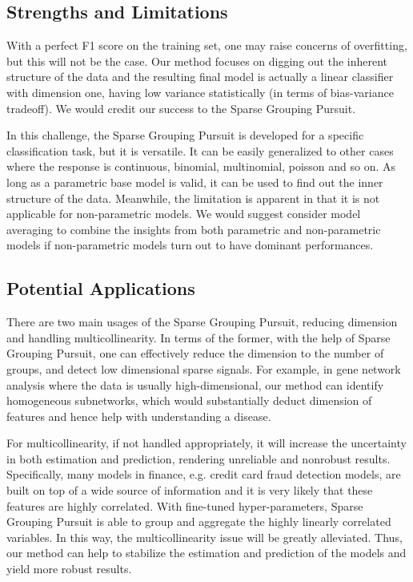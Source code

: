 \documentclass[11pt]{article}
\begin{document}
\subsection{Strengths and Limitations}
With a perfect F1 score on the training set, one may raise concerns of overfitting, but this will not be the case. 
Our method focuses on digging out the inherent structure of the data and the resulting final model is actually a linear classifier with dimension one, having low variance statistically (in terms of bias-variance tradeoff). We would credit our success to the Sparse Grouping Pursuit.

 In this challenge, the Sparse Grouping Pursuit is developed for a specific classification task, but it is versatile. It can be easily generalized to other cases where the response is continuous, binomial, multinomial, poisson and so on. As long as a parametric base model is valid, it can be used to find out the inner structure of the data. Meanwhile, the limitation is apparent in that it is not applicable for non-parametric models. We would suggest consider model averaging to combine the insights from both parametric and non-parametric models if non-parametric models turn out to have dominant performances.
 
\subsection{Potential Applications}
There are two main usages of the Sparse Grouping Pursuit, reducing dimension and handling multicollinearity. 
In terms of the former, with the help of Sparse Grouping Pursuit, 
one can effectively reduce the dimension to the number of groups, and detect low dimensional sparse signals. For example, in gene network analysis where the data is usually high-dimensional, our method can identify homogeneous subnetworks, which would substantially deduct dimension of features and hence help with understanding a disease.

For multicollinearity, if not handled appropriately, it will increase the uncertainty in both estimation and prediction, rendering unreliable and nonrobust results. Specifically, many models in finance, e.g. credit card fraud detection models, are built on top of a wide source of information and it is very likely that these features are highly correlated.
With fine-tuned hyper-parameters, Sparse Grouping Pursuit is able to group and aggregate the highly linearly correlated variables. In this way, the multicollinearity issue will be greatly alleviated.
Thus, our method can help to stabilize the estimation and prediction of the models and yield more robust results.
    
\end{document}
